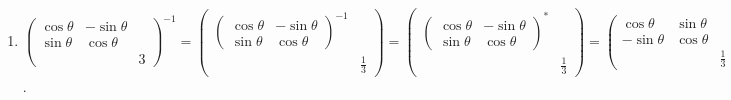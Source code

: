 \begin{enumerate}
			 \item %
			       $\begin{pmatrix}
					       \cos\theta & -\sin\theta     \\
					       \sin\theta & \cos\theta      \\
					                  &             & 3
				       \end{pmatrix}^{-1} = \begin{pmatrix}
					       \begin{pmatrix}
						       \cos\theta & -\sin\theta \\
						       \sin\theta & \cos\theta
					       \end{pmatrix}^{-1} &                  \\
					                                   & \frac{1}{3}
				       \end{pmatrix} = \begin{pmatrix}
					       \begin{pmatrix}
						       \cos\theta & -\sin\theta \\
						       \sin\theta & \cos\theta
					       \end{pmatrix}^{*} &                  \\
					                                   & \frac{1}{3}
				       \end{pmatrix} = \begin{pmatrix}
					       \cos\theta  & \sin\theta &             \\
					       -\sin\theta & \cos\theta &             \\
					                   &            & \frac{1}{3}
				       \end{pmatrix} \cdot $.


\end{enumerate}
